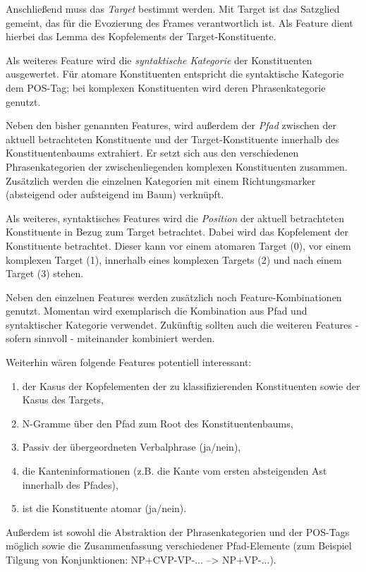 \documentclass[12pt]{article}
\begin{document}
Anschließend muss das \textit{Target} bestimmt werden. 
Mit Target ist das Satzglied gemeint, das für die Evozierung des Frames verantwortlich ist.
Als Feature dient hierbei das Lemma des Kopfelements der Target-Konstituente.

Als weiteres Feature wird die \textit{syntaktische Kategorie} der Konstituenten
ausgewertet. Für atomare Konstituenten entspricht die syntaktische Kategorie dem
POS-Tag; bei komplexen Konstituenten wird deren Phrasenkategorie genutzt.
 
Neben den bisher genannten Features, wird außerdem der \textit{Pfad} zwischen
der aktuell betrachteten Konstituente und der Target-Konstituente innerhalb des
Konstituentenbaums extrahiert. Er setzt sich aus den verschiedenen
Phrasenkategorien der zwischenliegenden komplexen Konstituenten zusammen.
Zusätzlich werden die einzelnen Kategorien mit einem Richtungsmarker
(absteigend oder aufsteigend im Baum) verknüpft.

Als weiteres, syntaktisches Features wird die \textit{Position} der aktuell
betrachteten Konstituente in Bezug zum Target betrachtet. Dabei wird das
Kopfelement der Konstituente betrachtet. Dieser kann vor einem atomaren Target
(0), vor einem komplexen Target (1), innerhalb eines komplexen Targets (2) und
nach einem Target (3) stehen.

Neben den einzelnen Features werden zusätzlich noch Feature-Kombinationen
genutzt. Momentan wird exemplarisch die Kombination aus Pfad und syntaktischer
Kategorie verwendet. Zukünftig sollten auch die weiteren Features - sofern
sinnvoll - miteinander kombiniert werden.

Weiterhin wären folgende Features potentiell interessant:
\begin{enumerate}
\item der Kasus der Kopfelementen der zu klassifizierenden Konstituenten sowie
der Kasus des Targets,
\item N-Gramme über den Pfad zum Root des Konstituentenbaums,
\item Passiv der übergeordneten Verbalphrase (ja/nein),
\item die Kanteninformationen (z.B. die Kante vom ersten absteigenden Ast
innerhalb des Pfades),
\item ist die Konstituente atomar (ja/nein).
\end{enumerate}

Außerdem ist sowohl die Abstraktion der Phrasenkategorien und der POS-Tags
möglich sowie die Zusammenfassung verschiedener Pfad-Elemente (zum Beispiel Tilgung von Konjunktionen: NP+CVP-VP-... --> NP+VP-...).
\end{document}

